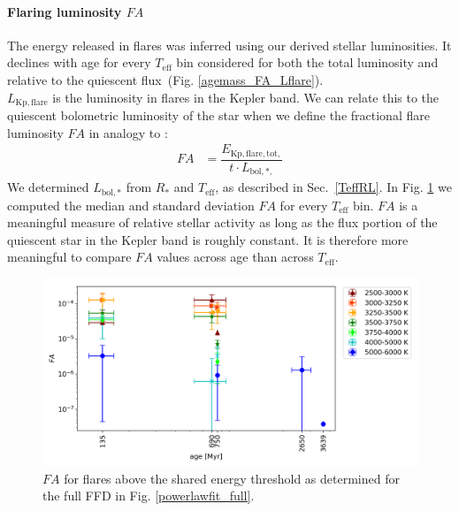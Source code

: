 \documentclass{aa}
\begin{document}
\paragraph{Flaring luminosity $FA$}
The energy released in flares was inferred using our derived stellar luminosities. It declines with age for every $T_\mathrm{eff}$ bin considered for both the total luminosity and relative to the quiescent flux~(Fig. \ref{agemass_FA_Lflare}).
\\
$L_\mathrm{Kp,flare}$ is the luminosity in flares in the Kepler band. We can relate this to the quiescent bolometric luminosity of the star when we define the fractional flare luminosity $FA$ in analogy to :
\begin{align}
\label{FA}
FA&=\dfrac{E_\mathrm{Kp,flare,tot,}}{t\cdot L_{\mathrm{bol,*,}}}
\end{align}
We determined $L_\mathrm{bol,*}$ from $R_*$ and $T_\mathrm{eff}$, as described in Sec.~\ref{TeffRL}. In Fig. \ref{FA_E} we computed the median and standard deviation $FA$ for every $T_\mathrm{eff}$ bin. $FA$ is a meaningful measure of relative stellar activity as long as the flux portion of the quiescent star in the Kepler band is roughly constant. It is therefore more meaningful to compare $FA$ values across age than across $T_\mathrm{eff}$.
\begin{figure}
    \centering
    \includegraphics[width=13.5cm]{pics/FA/FA_T_age_Ethresh.png}
    \caption{$FA$ for flares above the shared energy threshold as determined for the full FFD in Fig. \ref{powerlawfit_full}.}          
    \label{FA_E}
\end{figure}

\end{document}

